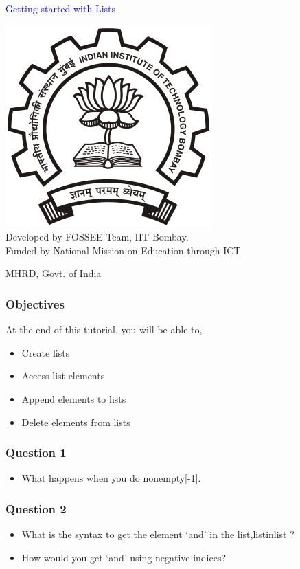 \documentclass[presentation]{beamer}
\title{}
\author{FOSSEE}
\date{2010-09-14 Tue}
\begin{document}
\begin{frame}

\begin{center}
\textcolor{blue}{Getting started with Lists}
\end{center}
\begin{center}
\includegraphics[scale=0.25]{../images/iitb-logo.png}\\
Developed by FOSSEE Team, IIT-Bombay. \\ 
Funded by National Mission on Education through ICT

MHRD, Govt. of India
\end{center}
\end{frame}
\begin{frame}
\frametitle{Objectives}
\label{sec-2}

  At the end of this tutorial, you will be able to, 

\begin{itemize}
\item Create lists
\item Access list elements
\item Append elements to lists
\item Delete elements from lists
\end{itemize}
\end{frame}
\begin{frame}
\frametitle{Question 1}
\label{sec-3}


\begin{itemize}
\item What happens when you do nonempty[-1].
\end{itemize}
\end{frame}
\begin{frame}
\frametitle{Question 2}
\label{sec-4}


\begin{itemize}
\item What is the syntax to get the element `and' 
     in the list,listinlist ?
\item How would you get `and' using negative indices?
\end{itemize}
\end{frame}
\end{document}
